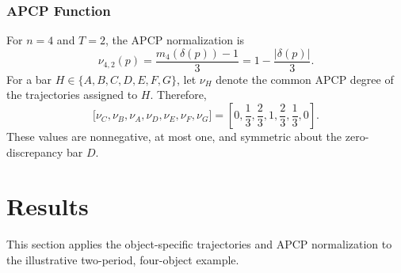 \documentclass[conference]{IEEEtran}
\theoremstyle{plain}
\theoremstyle{definition}
\theoremstyle{remark}
\begin{document}
	\subsubsection{APCP Function}
	For $n=4$ and $T=2$, the APCP normalization is
	\begin{equation}
		\nu_{4,2}(p)=\frac{m_4(\delta(p))-1}{3}
		=1-\frac{\lvert\delta(p)\rvert}{3}.
	\end{equation}
	For a bar $H\in\{A,B,C,D,E,F,G\}$, let $\nu_H$ denote the common APCP degree of the trajectories assigned to $H$. Therefore,
	\begin{equation}
		\bigl[\nu_C,\nu_B,\nu_A,\nu_D,\nu_E,\nu_F,\nu_G\bigr]
		=\left[0,\frac{1}{3},\frac{2}{3},1,\frac{2}{3},\frac{1}{3},0\right].
	\end{equation}
	These values are nonnegative, at most one, and symmetric about the zero-discrepancy bar $D$.
	\section{Results}
	This section applies the object-specific trajectories and APCP normalization to the illustrative two-period, four-object example.
	
\end{document}
